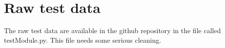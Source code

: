 

\chapter{Raw test data}

The raw test data are available in the github repository in the file
called testModule.py. This file needs some serious cleaning.

